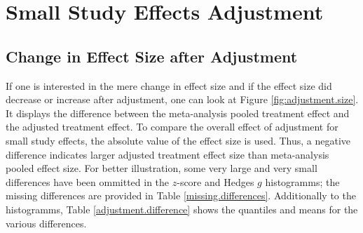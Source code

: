 \documentclass[11pt,a4paper,twoside]{book}\usepackage[]{graphicx}\usepackage[]{color}
\begin{document}
\section{Small Study Effects Adjustment}


\subsection{Change in Effect Size after Adjustment}

If one is interested in the mere change in effect size and if the effect size did decrease or increase after adjustment, one can look at Figure \ref{fig:adjustment.size}. It displays the difference between the meta-analysis pooled treatment effect and the adjusted treatment effect. To compare the overall effect of adjustment for small study effects, the absolute value of the effect size is used. Thus, a negative difference indicates larger adjusted treatment effect size than meta-analysis pooled effect size. For better illustration, some very large and very small differences have been ommitted in the $z$-score and Hedges $g$ histogramms; the missing differences are provided in Table \ref{missing.differences}. Additionally to the histogramms, Table \ref{adjustment.difference} shows the quantiles and means for the various differences.
\end{document}
